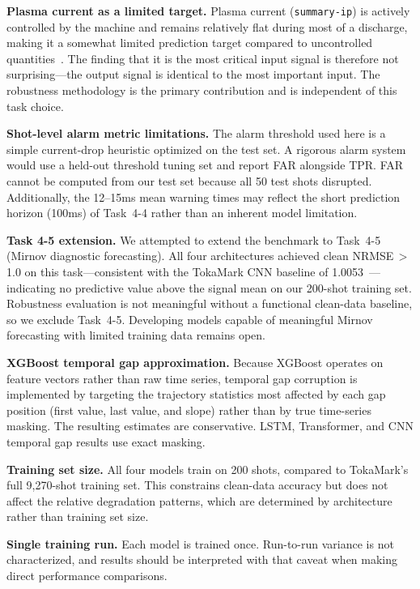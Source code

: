 \documentclass[10pt,twocolumn]{article}
\begin{document}
\textbf{Plasma current as a limited target.}
Plasma current (\texttt{summary-ip}) is actively controlled by the
machine and remains relatively flat during most of a discharge, making
it a somewhat limited prediction target compared to uncontrolled
quantities~\cite{jalalvand2025}. The finding that it is the most
critical input signal is therefore not surprising—the output signal
is identical to the most important input. The robustness methodology
is the primary contribution and is independent of this task choice.

\textbf{Shot-level alarm metric limitations.}
The alarm threshold used here is a simple current-drop heuristic
optimized on the test set. A rigorous alarm system would use a
held-out threshold tuning set and report FAR alongside TPR. FAR
cannot be computed from our test set because all 50 test shots
disrupted. Additionally, the 12--15ms mean warning times may reflect
the short prediction horizon (100ms) of Task~4-4 rather than an
inherent model limitation.

\textbf{Task 4-5 extension.}
We attempted to extend the benchmark to Task~4-5 (Mirnov diagnostic
forecasting). All four architectures achieved clean NRMSE\,$>$\,1.0
on this task—consistent with the TokaMark CNN baseline of
1.0053~\cite{rousseau2026tokamark}—indicating no predictive value
above the signal mean on our 200-shot training set. Robustness
evaluation is not meaningful without a functional clean-data baseline,
so we exclude Task~4-5. Developing models capable of meaningful
Mirnov forecasting with limited training data remains open.

\textbf{XGBoost temporal gap approximation.}
Because XGBoost operates on feature vectors rather than raw time series,
temporal gap corruption is implemented by targeting the trajectory
statistics most affected by each gap position (first value, last value,
and slope) rather than by true time-series masking. The resulting
estimates are conservative. LSTM, Transformer, and CNN temporal gap
results use exact masking.

\textbf{Training set size.}
All four models train on 200 shots, compared to TokaMark's full
9,270-shot training set. This constrains clean-data accuracy but does
not affect the relative degradation patterns, which are determined by
architecture rather than training set size.

\textbf{Single training run.}
Each model is trained once. Run-to-run variance is not characterized,
and results should be interpreted with that caveat when making direct
performance comparisons.
\end{document}
